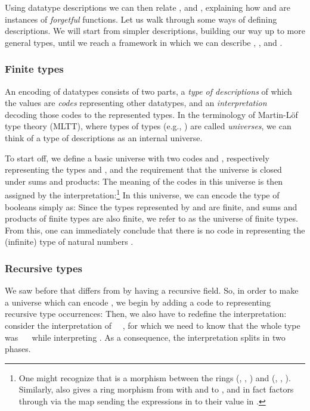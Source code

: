 Using datatype descriptions we can then relate \bN{},  and , explaining how  and  are instances of \emph{forgetful} functions. Let us walk through some ways of defining descriptions. We will start from simpler descriptions, building our way up to more general types, until we reach a framework in which we can describe \bN{}, ,  and . 


\subsubsection{Finite types}\label{ssec:background-fin}
An encoding of datatypes consists of two parts, a \emph{type of descriptions}  of which the values are \emph{codes} representing other datatypes, and an \emph{interpretation} \ \  decoding those codes to the represented types. In the terminology of Martin-L{\"{o}}f type theory (MLTT)\cite{levitation, mltt}, where types of types (e.g., ) are called \emph{universes}, we can think of a type of descriptions as an internal universe.

To start off, we define a basic universe with two codes  and , respectively representing the types  and , and the requirement that the universe is closed under sums and products:
The meaning of the codes in this universe is then assigned by the interpretation:\footnote{One might recognize that  is a morphism between the rings (, , ) and (, , ). Similarly,  also gives a ring morphism from \bN{} with \AF{+} and  to , and in fact  factors through  via the map sending the expressions in  to their value in \bN{}.}
In this universe, we can encode the type of booleans simply as:
Since the types represented by  and  are finite, and sums and products of finite types are also finite, we refer to  as the universe of finite types. From this, one can immediately conclude that there is no code in  representing the (infinite) type of natural numbers \bN{}.

\subsubsection{Recursive types}\label{ssec:background-rec}
We saw before that \bN{} differs from  by having a recursive field. So, in order to make a universe which can encode \bN{}, we begin by adding a code  to  representing recursive type occurrences:
Then, we also have to redefine the interpretation: consider the interpretation of \ \ , for which we need to know that the whole type was \ \  while interpreting . As a consequence, the interpretation splits in two phases. 

